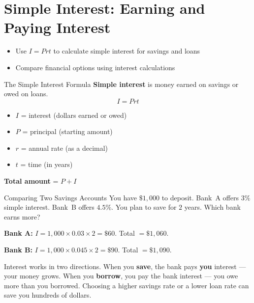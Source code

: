 \section{Simple Interest: Earning and Paying Interest}

\begin{learningGoals}
\begin{itemize}
    \item Use $I = Prt$ to calculate simple interest for savings and loans
    \item Compare financial options using interest calculations
\end{itemize}
\end{learningGoals}

\begin{conceptBox}{The Simple Interest Formula}
\textbf{Simple interest} is money earned on savings or owed on loans.
$$I = Prt$$
\begin{itemize}[leftmargin=*]
    \item $I$ = interest (dollars earned or owed)
    \item $P$ = principal (starting amount)
    \item $r$ = annual rate (as a decimal)
    \item $t$ = time (in years)
\end{itemize}
\textbf{Total amount} = $P + I$
\end{conceptBox}

\begin{workedExample}{Comparing Two Savings Accounts}
You have $\$1{,}000$ to deposit. Bank~A offers $3\%$ simple interest. Bank~B offers $4.5\%$. You plan to save for $2$ years. Which bank earns more?

\textbf{Bank A:} $I = 1{,}000 \times 0.03 \times 2 = \$60$. Total $= \$1{,}060$.

\textbf{Bank B:} $I = 1{,}000 \times 0.045 \times 2 = \$90$. Total $= \$1{,}090$.

\end{workedExample}

\begin{realWorld}
Interest works in two directions. When you \textbf{save}, the bank pays \textbf{you} interest — your money grows. When you \textbf{borrow}, you pay the bank interest — you owe more than you borrowed. Choosing a higher savings rate or a lower loan rate can save you hundreds of dollars.
\end{realWorld}

